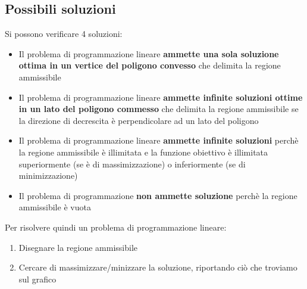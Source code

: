 \subsection{Possibili soluzioni}
Si possono verificare 4 soluzioni:
\begin{itemize}
    \item Il problema di programmazione lineare \textbf{ammette una sola soluzione ottima in un vertice del poligono convesso} che delimita la regione ammissibile
    \item Il problema di programmazione lineare \textbf{ammette infinite soluzioni ottime in un lato del poligono commesso} che delimita la regione ammissibile se la direzione di decrescita è perpendicolare ad un lato del poligono
    \item Il problema di programmazione lineare \textbf{ammette infinite soluzioni} perchè la regione ammissibile è illimitata e la funzione obiettivo è illimitata superiormente (se è di massimizzazione) o inferiormente (se di minimizzazione)
    \item Il problema di programmazione \textbf{non ammette soluzione} perchè la regione ammissibile è vuota 
\end{itemize}

Per risolvere quindi un problema di programmazione lineare:
\begin{enumerate}
    \item Disegnare la regione ammissibile
    \item Cercare di massimizzare/minizzare la soluzione, riportando ciò che troviamo sul grafico
\end{enumerate}
